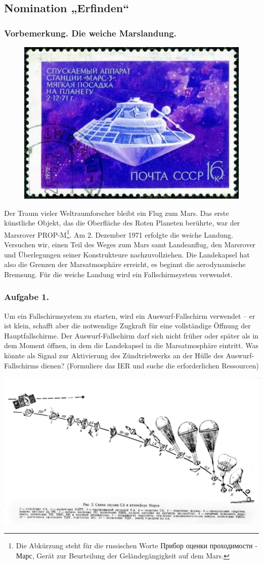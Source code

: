 \documentclass[11pt,a4paper]{article}
\begin{document}
\subsection{Nomination „Erfinden“}

\subsubsection*{Vorbemerkung. Die weiche Marslandung.}

\begin{figure}\vspace*{-1em}\centering
\includegraphics[width=.25\textwidth]{jEMlaM.jpg}
\end{figure}
Der Traum vieler Weltraumforscher bleibt ein Flug zum Mars. Das erste
künstliche Objekt, das die Oberfläche des Roten Planeten berührte, war der
Marsrover PROP-M\footnote{Die Abkürzung steht für die russischen Worte
  \foreignlanguage{russian}{Прибор оценки проходимости - Марс}, Gerät zur
  Beurteilung der Geländegängigkeit auf dem Mars.}. Am 2. Dezember 1971
erfolgte die weiche Landung.  Versuchen wir, einen Teil des Weges zum Mars
samt Landeanflug, den Marsrover und Überlegungen seiner Konstrukteure
nachzuvollziehen. Die Landekapsel hat also die Grenzen der Marsatmosphäre
erreicht, es beginnt die aerodynamische Bremsung.  Für die weiche Landung wird
ein Fallschirmsystem verwendet.

\subsubsection*{Aufgabe 1.}
Um ein Fallschirmsystem zu starten, wird ein Auswurf-Fallschirm verwendet --
er ist klein, schafft aber die notwendige Zugkraft für eine vollständige
Öffnung der Hauptfallschirme. Der Auswurf-Fallschirm darf sich nicht früher
oder später als in dem Moment öffnen, in dem die Landekapsel in die
Marsatmosphäre eintritt. Was könnte als Signal zur Aktivierung des
Zündtriebwerks an der Hülle des Auswurf-Fallschirms dienen?  (Formuliere das
IER und suche die erforderlichen Ressourcen)
\begin{center}
\includegraphics[width=.95\textwidth]{12uaYg.png}
\end{center}
\end{document}
